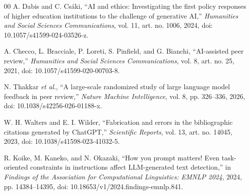 \documentclass[a4paper,10pt,conference]{IEEEtran}
\begin{document}
\begin{thebibliography}{00}
A. Dabis and C. Cs\'aki, ``AI and ethics: Investigating the first policy
responses of higher education institutions to the challenge of generative AI,''
\emph{Humanities and Social Sciences Communications}, vol. 11, art. no. 1006,
2024, doi: 10.1057/s41599-024-03526-z.

A. Checco, L. Bracciale, P. Loreti, S. Pinfield, and G. Bianchi,
``AI-assisted peer review,'' \emph{Humanities and Social Sciences
Communications}, vol. 8, art. no. 25, 2021,
doi: 10.1057/s41599-020-00703-8.

N. Thakkar \emph{et al.}, ``A large-scale randomized study of large language
model feedback in peer review,'' \emph{Nature Machine Intelligence}, vol. 8,
pp. 326--336, 2026, doi: 10.1038/s42256-026-01188-x.

W. H. Walters and E. I. Wilder, ``Fabrication and errors in the bibliographic
citations generated by ChatGPT,'' \emph{Scientific Reports}, vol. 13, art. no.
14045, 2023, doi: 10.1038/s41598-023-41032-5.

R. Koike, M. Kaneko, and N. Okazaki, ``How you prompt matters! Even
task-oriented constraints in instructions affect LLM-generated text detection,''
in \emph{Findings of the Association for Computational Linguistics: EMNLP
2024}, 2024, pp. 14384--14395, doi: 10.18653/v1/2024.findings-emnlp.841.

\end{thebibliography}
\end{document}
